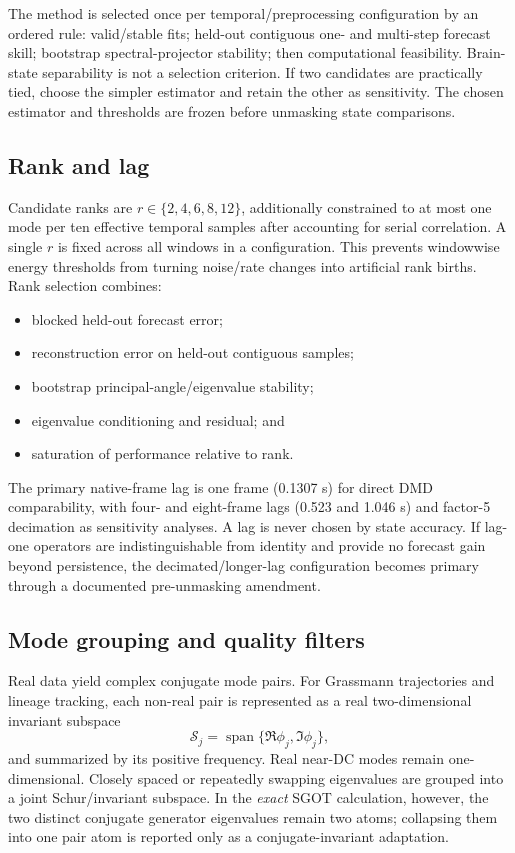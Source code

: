 \documentclass[11pt,a4paper]{article}
\begin{document}
The method is selected once per temporal/preprocessing configuration by an ordered rule: valid/stable fits; held-out contiguous one- and multi-step forecast skill; bootstrap spectral-projector stability; then computational feasibility. Brain-state separability is not a selection criterion. If two candidates are practically tied, choose the simpler estimator and retain the other as sensitivity. The chosen estimator and thresholds are frozen before unmasking state comparisons.

\subsection{Rank and lag}

Candidate ranks are $r\in\{2,4,6,8,12\}$, additionally constrained to at most one mode per ten effective temporal samples after accounting for serial correlation. A single $r$ is fixed across all windows in a configuration. This prevents windowwise energy thresholds from turning noise/rate changes into artificial rank births. Rank selection combines:

\begin{itemize}
  \item blocked held-out forecast error;
  \item reconstruction error on held-out contiguous samples;
  \item bootstrap principal-angle/eigenvalue stability;
  \item eigenvalue conditioning and residual; and
  \item saturation of performance relative to rank.
\end{itemize}

The primary native-frame lag is one frame (0.1307 s) for direct DMD comparability, with four- and eight-frame lags (0.523 and 1.046 s) and factor-5 decimation as sensitivity analyses. A lag is never chosen by state accuracy. If lag-one operators are indistinguishable from identity and provide no forecast gain beyond persistence, the decimated/longer-lag configuration becomes primary through a documented pre-unmasking amendment.

\subsection{Mode grouping and quality filters}

Real data yield complex conjugate mode pairs. For Grassmann trajectories and lineage tracking, each non-real pair is represented as a real two-dimensional invariant subspace
\begin{equation}
  \mathcal S_j=\operatorname{span}\{\Re\phi_j,\Im\phi_j\},
\end{equation}
and summarized by its positive frequency. Real near-DC modes remain one-dimensional. Closely spaced or repeatedly swapping eigenvalues are grouped into a joint Schur/invariant subspace. In the \emph{exact} SGOT calculation, however, the two distinct conjugate generator eigenvalues remain two atoms; collapsing them into one pair atom is reported only as a conjugate-invariant adaptation.
\end{document}
